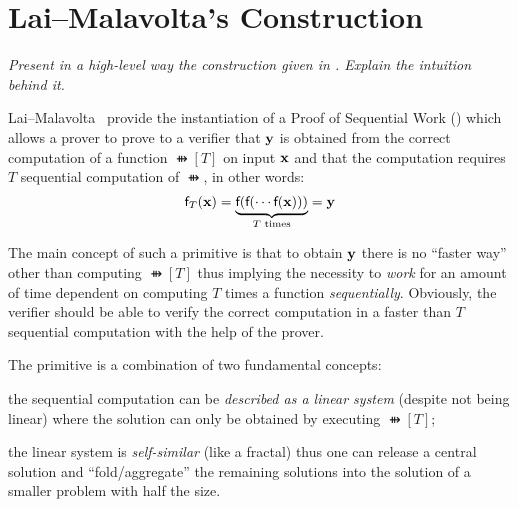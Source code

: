 
\section{Lai--Malavolta's Construction}\label{sec:construction}

\begin{center}
\itshape
Present in a high-level way the construction given in \cite{EPRINT:LaiMal24}.
		Explain the intuition behind it.
\end{center}

Lai--Malavolta~\cite{EPRINT:LaiMal24,C:LaiMal23} provide the instantiation of a Proof of
Sequential Work (\PoSW) which allows a prover to prove to a verifier that $\vy$ is obtained from the
correct computation of a function $\ffun[T]{}$ on input $\vx$ and that the computation requires
$T$ sequential computation of $\ffun{}$, in other words:
\[\ffun[T]{\vx} = \underbrace{\ffun{\ffun{\cdots \ffun{\vx}}}}_{T \text{ times}} = \vy\]

The main concept of such a primitive is that to obtain $\vy$ there is no ``faster way'' other
than computing $\ffun[T]{}$ thus implying the necessity to \emph{work} for an amount of time
dependent on computing $T$ times a function \emph{sequentially}.
%
Obviously, the verifier should be able to verify the correct computation in a faster than $T$
sequential computation with the help of the prover.


The primitive is a combination of two fundamental concepts: 
\begin{enumerate*}[label=\emph{(\roman*)}]
	\item the sequential computation can be \emph{described as a linear system}
		(despite not being linear) where the solution can only be obtained by executing $\ffun[T]{}$;
	\item the linear system is \emph{self-similar} (like a fractal) thus one can release
		a central solution and ``fold/aggregate'' the remaining solutions into the solution of a
		smaller problem with half the size.
\end{enumerate*}


